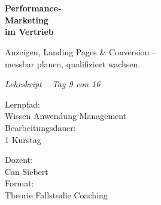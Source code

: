 \documentclass[11pt,a4paper,oneside]{article}
\newcommand{\caveatfontfallback}{\itshape}
\newcommand\caveatfont{\caveatfontfallback}%
\begin{document}
\begin{titlepage}
  \pagestyle{empty}
  \vspace*{1.5cm}
  \\[2pt]
  \noindent{\color{lpAccent}\rule{\linewidth}{1.2pt}}\\[4pt]

  \vspace{3cm}
  {\sffamily\fontsize{30}{34}\selectfont\bfseries\color{lpInk}Performance-\\Marketing\\im Vertrieb\par}

  \vspace{0.7cm}
  {\sffamily\large\color{lpGray}Anzeigen, Landing Pages \& Conversion --\\messbar planen, qualifiziert wachsen.\par}

  \vspace{1.5cm}
  {\caveatfont\LARGE\color{lpAmber}Lehrskript -- Tag 9 von 16}\par

  \vfill

  \noindent\begin{minipage}{0.55\linewidth}
    {\sffamily\footnotesize\color{lpGray}Lernpfad:}\\
    {\sffamily\small\color{lpInk}Wissen \textrightarrow{} Anwendung \textrightarrow{} Management}\\[10pt]
    {\sffamily\footnotesize\color{lpGray}Bearbeitungsdauer:}\\
    {\sffamily\small\color{lpInk}1 Kurstag}
  \end{minipage}\hfill
  \begin{minipage}{0.4\linewidth}
    \raggedleft
    {\sffamily\footnotesize\color{lpGray}Dozent:}\\
    {\sffamily\small\color{lpInk}Can Siebert}\\[10pt]
    {\sffamily\footnotesize\color{lpGray}Format:}\\
    {\sffamily\small\color{lpInk}Theorie \textperiodcentered{} Fallstudie \textperiodcentered{} Coaching}
  \end{minipage}

  \vspace{0.5cm}
  \noindent{\color{lpAccent}\rule{\linewidth}{0.6pt}}
\end{titlepage}
\end{document}
